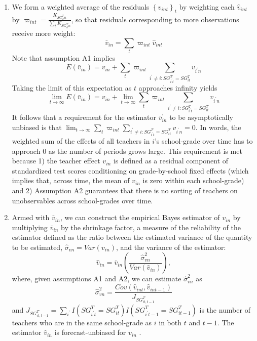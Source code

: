 \documentclass[notitlepage,12pt]{article}%
\begin{document}
\begin{enumerate}
\begin{enumerate}
\item We form a weighted average of the residuals $\left\{  \widehat{v}%
_{int}\right\}  _{t}$ by weighting each $\widehat{v}_{int}$ by $\varpi
_{int}=\frac{K_{SG_{it}^{T}n}}{\sum_{t}K_{SG_{it}^{T}n}}$, so that residuals
corresponding to more observations receive more weight:%
\begin{equation}
\bar{v}_{in}=\sum_{t}\varpi_{int}\widehat{v}_{int} \label{unshrunk}%
\end{equation}
Note that assumption A1 implies
\[
E(\bar{v}_{in})=v_{in}+\sum_{t}\varpi_{int}\sum_{i^{\prime}\neq
i:SG_{i^{\prime}t}^{T}=SG_{it}^{T}}v_{i^{\prime}n}%
\]
Taking the limit of this expectation as $t$ approaches infinity yields
\[
\lim_{t\rightarrow\infty}E(\bar{v}_{in})=v_{in}+\lim_{t\rightarrow\infty}%
\sum_{t}\varpi_{int}\sum_{i^{\prime}\neq i:SG_{i^{\prime}t}^{T}=SG_{it}^{T}%
}v_{i^{\prime}n}%
\]
It follows that a requirement for the estimator $\bar{v}_{in}^{\prime}$ to be
asymptotically unbiased is that $\lim_{t\rightarrow\infty}\sum_{t}\varpi
_{int}\sum_{i^{\prime}\neq i:SG_{i^{\prime}t}^{T}=SG_{it}^{T}}v_{i^{\prime}%
n}=0$. In words, the weighted sum of the effects of all teachers in $i$'s
school-grade over time has to approach $0$ as the number of periods grows
large. This requirement is met because 1) the teacher effect $v_{in}$ is
defined as a residual component of standardized test scores conditioning on
grade-by-school fixed effects (which implies that, across time, the mean of
$v_{in}$ is zero within each school-grade) and 2) Assumption A2 guarantees
that there is no sorting of teachers on unobservables across school-grades
over time.

\item Armed with $\bar{v}_{in}$, we can construct the empirical Bayes
estimator of $v_{in}$ by multiplying $\bar{v}_{in}$ by the shrinkage factor, a
measure of the reliability of the estimator defined as the ratio between the
estimated variance of the quantity to be estimated, $\hat{\sigma}%
_{vn}=Var(v_{in})$, and the variance of the estimator:
\[
\hat{v}_{in}=\bar{v}_{in}\left(  \frac{\widehat{\sigma}_{vn}^{2}}{Var(\bar
{v}_{in})}\right)  ,
\]
where, given assumptions A1 and A2, we can estimate $\hat{\sigma}^{2}_{vn}$
as
\[
\widehat{\sigma}_{vn}^{2}=\frac{Cov(\widehat{v}_{int},\widehat{v}_{int-1}%
)}{J_{SG_{it,t-1}^{T}}}%
\]
and $J_{SG_{it,t-1}^{T}}=\sum_{i^{\prime}}I(SG_{i^{\prime}t}^{T}=SG_{it}%
^{T})I(SG_{i^{\prime}t-1}^{T}=SG_{it-1}^{T})$ is the number of teachers who
are in the same school-grade as $i$ in both $t$ and $t-1$. The estimator $\hat{v}_{in}$ is forecast-unbiased for $v_{in}$ \citep{chetty2014measuring}.

\end{enumerate}
\end{enumerate}
\end{document}
